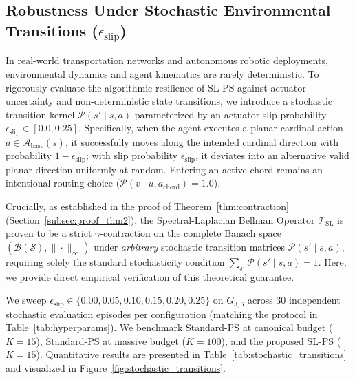 \documentclass[11pt,a4paper]{article}
\begin{document}
\subsection{Robustness Under Stochastic Environmental Transitions ($\epsilon_{\text{slip}}$)}
\label{subsec:stochastic_transitions}

In real-world transportation networks and autonomous robotic deployments, environmental dynamics and agent kinematics are rarely deterministic. To rigorously evaluate the algorithmic resilience of SL-PS against actuator uncertainty and non-deterministic state transitions, we introduce a stochastic transition kernel $\mathcal{P}(s' \mid s, a)$ parameterized by an actuator slip probability $\epsilon_{\text{slip}} \in [0.0, 0.25]$. Specifically, when the agent executes a planar cardinal action $a \in \mathcal{A}_{\text{base}}(s)$, it successfully moves along the intended cardinal direction with probability $1 - \epsilon_{\text{slip}}$; with slip probability $\epsilon_{\text{slip}}$, it deviates into an alternative valid planar direction uniformly at random. Entering an active chord remains an intentional routing choice ($\mathcal{P}(v \mid u, a_{\text{chord}}) = 1.0$).

Crucially, as established in the proof of Theorem~\ref{thm:contraction} (Section~\ref{subsec:proof_thm2}), the Spectral-Laplacian Bellman Operator $\mathcal{T}_{\text{SL}}$ is proven to be a strict $\gamma$-contraction on the complete Banach space $(\mathcal{B}(\mathcal{S}), \|\cdot\|_\infty)$ under \textit{arbitrary} stochastic transition matrices $\mathcal{P}(s' \mid s, a)$, requiring solely the standard stochasticity condition $\sum_{s'} \mathcal{P}(s' \mid s, a) = 1$. Here, we provide direct empirical verification of this theoretical guarantee.

We sweep $\epsilon_{\text{slip}} \in \{0.00, 0.05, 0.10, 0.15, 0.20, 0.25\}$ on $G_{3,6}$ across 30 independent stochastic evaluation episodes per configuration (matching the protocol in Table~\ref{tab:hyperparams}). We benchmark Standard-PS at canonical budget ($K=15$), Standard-PS at massive budget ($K=100$), and the proposed SL-PS ($K=15$). Quantitative results are presented in Table~\ref{tab:stochastic_transitions} and visualized in Figure~\ref{fig:stochastic_transitions}.
\end{document}
